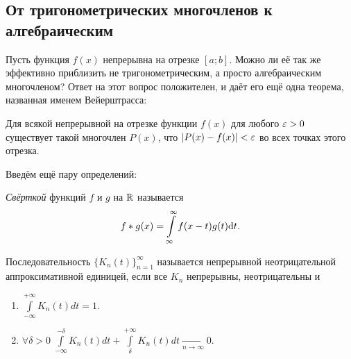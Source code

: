\subsection{От тригонометрических многочленов к алгебраическим}
Пусть функция $f(x)$ непрерывна на отрезке $[a;b]$. Можно ли её так же эффективно приблизить не тригонометрическим, а просто алгебраическим многочленом? Ответ на этот вопрос положителен, и даёт его ещё одна теорема, названная именем Вейерштрасса:
\begin{Theorem}[Вейерштрасс]
	Для всякой непрерывной на отрезке функции $f(x)$ для любого $\varepsilon > 0$ существует такой многочлен $P(x)$, что $|P(x) - f(x)| < \varepsilon$ во всех точках этого отрезка.
\end{Theorem}
Введём ещё пару определений:
\begin{Def}
	\textit{Свёрткой} функций $f$ и $g$ на $\mathbb{R}$ называется
	$$
		f*g(x) = \int\limits_{\infty}^{\infty} f(x-t)g(t) \mathrm{d} t.
	$$
\end{Def}
\begin{Def}
	Последовательность $\{K_n(t)\}_{n=1}^{\infty}$ называется непрерывной неотрицательной аппроксимативной единицей, если все $K_n$ непрерывны, неотрицательны и
	\begin{enumerate}
		\item $\int\limits_{-\infty}^{+\infty}K_n(t) dt = 1$.
		\item $\forall \delta > 0 \; \int\limits_{-\infty}^{-\delta}K_n(t)dt + \int\limits_{\delta}^{+\infty}K_n(t) dt \underset{n \to \infty}{\longrightarrow}0$.
	\end{enumerate}
\end{Def}
